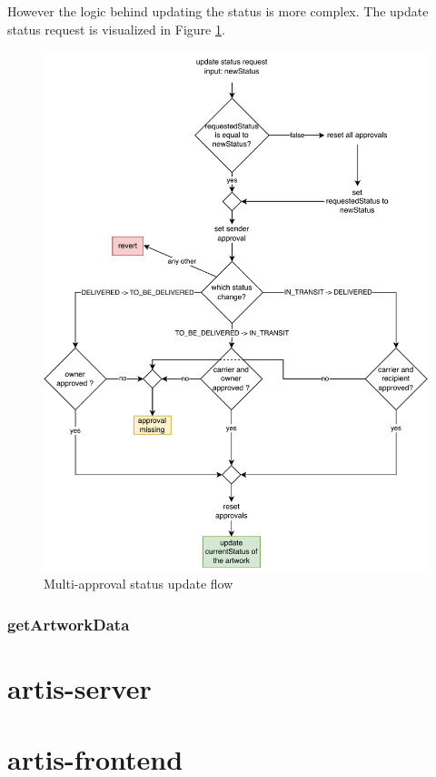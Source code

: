 However the logic behind updating the status is more complex. The update status request is visualized in Figure \ref{fig:update_status}.

\begin{figure}
    \centering
    \includegraphics[width=\textwidth, keepaspectratio]{diagrams/update_status.drawio.pdf}
    \caption{Multi-approval status update flow}
    \label{fig:update_status}
\end{figure}

\subsubsection{getArtworkData}

\section{artis-server}


\section{artis-frontend}
